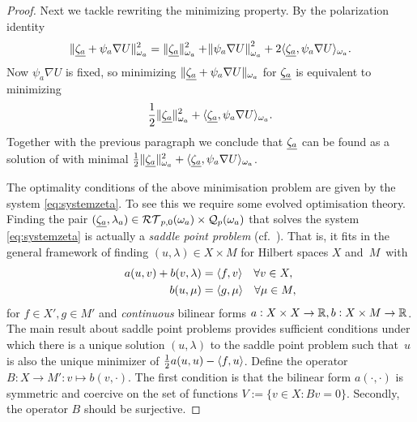 \documentclass[thesis.tex]{subfiles}
\begin{document}
\begin{proof}
%
  Next we tackle rewriting the minimizing property. By the polarization identity
  \[
    \| \underline{\zeta_a} + \psi_a \nabla U \|_{\omega_a}^2 = \| \underline{\zeta_a} \|_{\omega_a}^2 + \norm{\psi_a \nabla U}^2_{\omega_a} + 2 \langle \underline{\zeta_a}, \psi_a \nabla 
    U \rangle_{\omega_a}.
  \]
  Now $\psi_a \nabla U$ is fixed,  so minimizing $\| \underline{\zeta_a} + \psi_a \nabla U \|_{\omega_a}$ for $\underline{\zeta_a}$ is equivalent to minimizing
  \[
    \frac{1}{2} \| \underline{\zeta_a} \|^2_{\omega_a} + \langle \underline{\zeta_a}, \psi_a \nabla U \rangle_{\omega_a}.
  \]
  Together with the previous paragraph we conclude that $\underline{\zeta_a}$ can be found as a solution of \label{eq:defzetanoproj} with
  minimal $\frac{1}{2} \| \underline{\zeta_a} \|^2_{\omega_a} + \langle \underline{\zeta_a}, \psi_a \nabla U \rangle_{\omega_a}$.

  The optimality conditions of the above minimisation problem are given by the system \eqref{eq:systemzeta}.
  To see this we require some evolved optimisation theory. 
  Finding the pair $(\underline{\zeta_a}, {{\lambda_a}}) \in \mathcal{RT}_{p,0}(\omega_a) \times \mathcal{Q}_p(\omega_a)$ that solves the system 
  \eqref{eq:systemzeta} is actually a \emph{saddle point problem} (cf.~\cite{brezzimixed, braess2007finite}).
  That is, it fits in the general framework of finding $(u, \lambda) \in X \times M$ for Hilbert spaces $X$ and~$M$~with
    \begin{align*}
      a(u,v) + b(v,\lambda) &= \langle f,v \rangle \quad \forall v \in X,\\
      b(u, \mu) &= \langle g,\mu \rangle \quad \forall \mu \in M,
    \end{align*}
    for $f \in X', g \in M'$ and \emph{continuous} bilinear forms $a: X \times X \to \mathbb{R}, b : X \times M \to \mathbb{R}$.
    The main result about saddle point problems \cite[Thm~4.2.1]{brezzimixed} provides sufficient conditions under which there 
    is a unique solution $(u, \lambda)$ to the saddle point problem such that~$u$ is also the unique minimizer of 
    $\frac{1}{2} a(u,u) - \langle f,u \rangle$. Define the operator $B: X \to M' : v \mapsto b(v,\cdot)$. The first condition is that the bilinear form $a(\cdot, \cdot)$ is
    symmetric and coercive on the set of functions $V := \{v \in X : Bv = 0\}$.
    Secondly, the operator $B$ should be surjective.


\end{proof}
\end{document}
